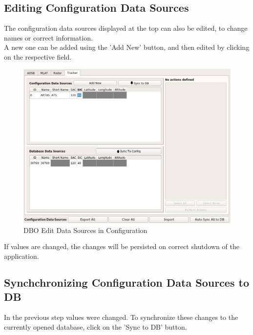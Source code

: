\subsection{Editing Configuration Data Sources}

The configuration data sources displayed at the top can also be edited, to change names or correct information. \\

A new one can be added using the 'Add New' button, and then edited by clicking on the respective field. \\

\begin{figure}[H]
  \center
    \includegraphics[width=16cm,frame]{../screenshots/manage_data_sources_edit_ds_cfg.png}
  \caption{DBO Edit Data Sources in Configuration}
\end{figure}

If values are changed, the changes will be persisted on correct shutdown of the application.

\subsection{Synchchronizing Configuration Data Sources to DB}

In the previous step values were changed. To synchronize these changes to the currently opened database, click on the 'Sync to DB' button.

